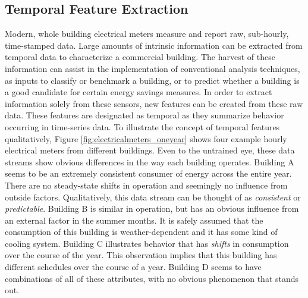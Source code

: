 \subsection{Temporal Feature Extraction}
\label{temporalfeatureextraction}
Modern, whole building electrical meters measure and report raw, sub-hourly, time-stamped data. Large amounts of intrinsic information can be extracted from temporal data to characterize a commercial building. The harvest of these information can assist in the implementation of conventional analysis techniques, as inputs to classify or benchmark a building, or to predict whether a building is a good candidate for certain energy savings measures. In order to extract information solely from these sensors, new features can be created from these raw data. These features are designated as temporal as they summarize behavior occurring in time-series data. To illustrate the concept of temporal features qualitatively, Figure \ref{fig:electricalmeters_oneyear} shows four example hourly electrical meters from different buildings. Even to the untrained eye, these data streams show obvious differences in the way each building operates. Building A seems to be an extremely consistent consumer of energy across the entire year. There are no steady-state shifts in operation and seemingly no influence from outside factors. Qualitatively, this data stream can be thought of as \emph{consistent} or \emph{predictable}. Building B is similar in operation, but has an obvious influence from an external factor in the summer months. It is safely assumed that the consumption of this building is weather-dependent and it has some kind of cooling system. Building C illustrates behavior that has \emph{shifts} in consumption over the course of the year. This observation implies that this building has different schedules over the course of a year. Building D seems to have combinations of all of these attributes, with no obvious phenomenon that stands out. 
